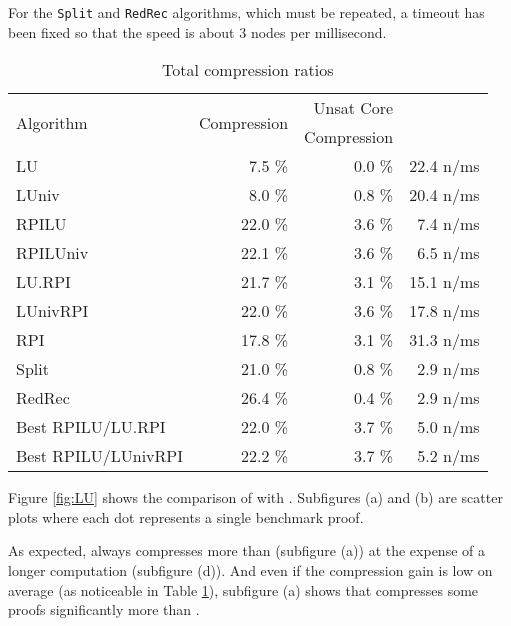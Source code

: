 \documentclass{easychair}
\begin{document}
For the \texttt{Split} and \texttt{RedRec} algorithms, which must be repeated, a timeout has
been fixed so that the speed is about 3 nodes per millisecond. 


\begin{table}[tb]
  \caption{Total compression ratios}
  \label{tab:average}
  \centering
  \begin{tabular}{lrrr}
    \toprule
    \multirow{2}{*}{Algorithm} & \multirow{2}{*}{Compression} & Unsat Core    & \phantom{.........}\multirow{2}{*}{Speed} \\
                                             &                                               & \phantom{...}Compression &        \\
    \midrule
    LU                &  7.5 \% &  0.0 \% & 22.4 n/ms \\
    LUniv             &  8.0 \% &  0.8 \% & 20.4 n/ms \\
    RPILU             & 22.0 \% &  3.6 \% &  7.4 n/ms \\
    RPILUniv          & 22.1 \% &  3.6 \% &  6.5 n/ms \\
    LU.RPI            & 21.7 \% &  3.1 \% & 15.1 n/ms \\
    LUnivRPI          & 22.0 \% &  3.6 \% & 17.8 n/ms \\
    RPI               & 17.8 \% &  3.1 \% & 31.3 n/ms \\
    Split             & 21.0 \% &  0.8 \% &  2.9 n/ms \\
    RedRec            & 26.4 \% &  0.4 \% &  2.9 n/ms \\
    Best RPILU/LU.RPI       & 22.0 \% &  3.7 \% &  5.0 n/ms \\
    Best RPILU/LUnivRPI & 22.2 \% &  3.7 \% &  5.2 n/ms \\
    \bottomrule
  \end{tabular}
\end{table}

\newcommand{\va}[1]{\ensuremath{v_{\text{#1}}}}

Figure \ref{fig:LU} shows the comparison of {\LowerUnits} with {\LowerUnivalents}. Subfigures (a) and (b) are scatter plots where each dot represents a single benchmark proof. 




As expected, {\LowerUnivalents} always compresses more than {\LowerUnits} (subfigure (a)) at the expense of a longer
computation (subfigure (d)). And even if the compression gain is low on average (as noticeable in Table \ref{tab:average}), subfigure (a) shows that {\LowerUnivalents} compresses some proofs significantly more than {\LowerUnits}.
\end{document}
